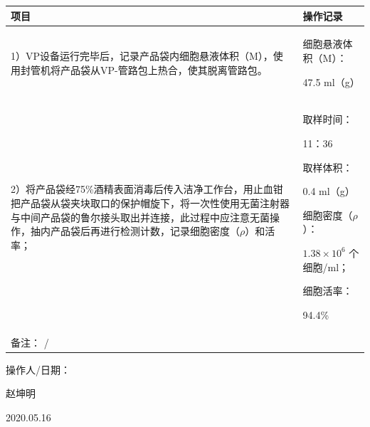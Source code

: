 \documentclass[UTF8,10pt,a4paper,fontset=fandol]{ctexart}
\newcommand{\fieldvalue}[1]{#1}
\newcommand{\handwritten}[1]{#1}
\begin{document}
\begin{tabularx}{\textwidth}{|p{}|X|}
\hline
\centering 项目 & \centering 操作记录 \tabularnewline
\hline
1）VP设备运行完毕后，记录产品袋内细胞悬液体积（M），使用封管机将产品袋从VP-管路包上热合，使其脱离管路包。 &
细胞悬液体积（M）：

\fieldvalue{\handwritten{47.5}} ml（g） \\
\hline
2）将产品袋经75\%酒精表面消毒后传入洁净工作台，用止血钳把产品袋从袋夹块取口的保护帽旋下，将一次性使用无菌注射器与中间产品袋的鲁尔接头取出并连接，此过程中应注意无菌操作，抽内产品袋后再进行检测计数，记录细胞密度（$\rho$）和活率； &
取样时间：

\fieldvalue{\handwritten{11：36}}

\vspace{0.4em}

取样体积：

\fieldvalue{\handwritten{0.4}} ml（g）

\vspace{0.4em}

细胞密度（$\rho$）：

\fieldvalue{\handwritten{$1.38 \times 10^{6}$}} 个细胞/ml；

\vspace{0.4em}

细胞活率：

\fieldvalue{\handwritten{94.4}}\% \\
\hline
\multicolumn{2}{|l|}{备注：\quad
\fieldvalue{\handwritten{/}}} \\
\hline
\end{tabularx}

\vspace{0.3em}

\noindent
操作人/日期：

\fieldvalue{\handwritten{赵坤明}}

\quad

\fieldvalue{\handwritten{2020.05.16}}
\end{document}
